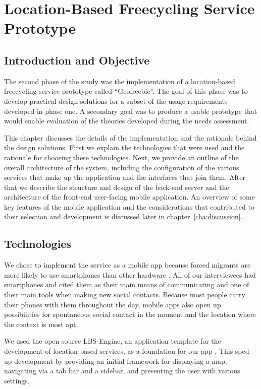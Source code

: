 \chapter{Location-Based Freecycling Service Prototype}
\label{cha:prototype}


\section{Introduction and Objective }
\label{sec:prototype_introduction}

The second phase of the study was the implementation of a location-based freecycling service prototype called ``Geofreebie''. The goal of this phase was to develop practical design solutions for a subset of the usage requirements developed in phase one. A secondary goal was to produce a usable prototype that would enable evaluation of the theories developed during the needs assessment.

This chapter discusses the details of the implementation and the rationale behind the design solutions. First we explain the technologies that were used and the rationale for choosing these technologies. Next, we provide an outline of the overall architecture of the system, including the configuration of the various services that make up the application and the interfaces that join them. After that we describe the structure and design of the back-end server and the architecture of the front-end user-facing mobile application. An overview of some key features of the mobile application and the considerations that contributed to their selection and development is discussed later in chapter~\ref{cha:discussion}.


\section{Technologies}
\label{sec:technologies}

We chose to implement the service as a mobile app because forced migrants are more likely to use smartphones than other hardware \cite{xu_communication_2016}. All of our interviewees had smartphones and cited them as their main means of communicating and one of their main tools when making new social contacts. Because most people carry their phones with them throughout the day, mobile apps also open up possibilities for spontaneous social contact in the moment and the location where the context is most apt.

We used the open source LBS-Engine, an application template for the development of location-based services, as a foundation for our app \cite{einfeldt_lbs_2018}. This sped up development by providing an initial framework for displaying a map, navigating via a tab bar and a sidebar, and presenting the user with various settings.

